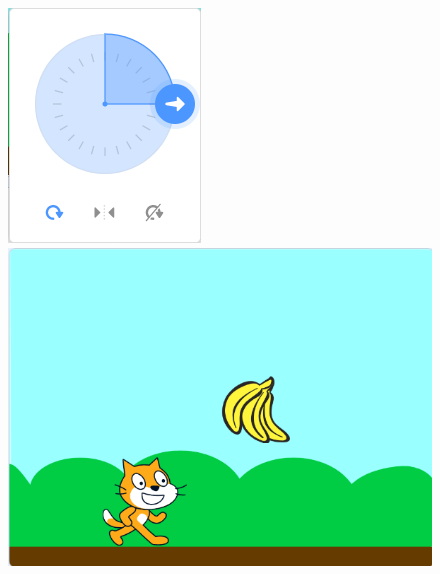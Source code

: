 \documentclass[10.5pt, a4paper]{article}
\begin{document}
\begin{enumerate}
        \begin{figure}[htbp]
            \centering
            \begin{minipage}[t]{.4\textwidth}
                \centering
                \begin{minipage}[t]{.17\textwidth}
                    \centering
                    \includegraphics[width=\textwidth]{9-1.png}
                \end{minipage}
                \begin{minipage}[t]{.4\textwidth}
                    \centering
                    \includegraphics[width=1\textwidth]{9-2.png}

\end{minipage}
\end{minipage}
\end{figure}
\end{enumerate}
\end{document}
